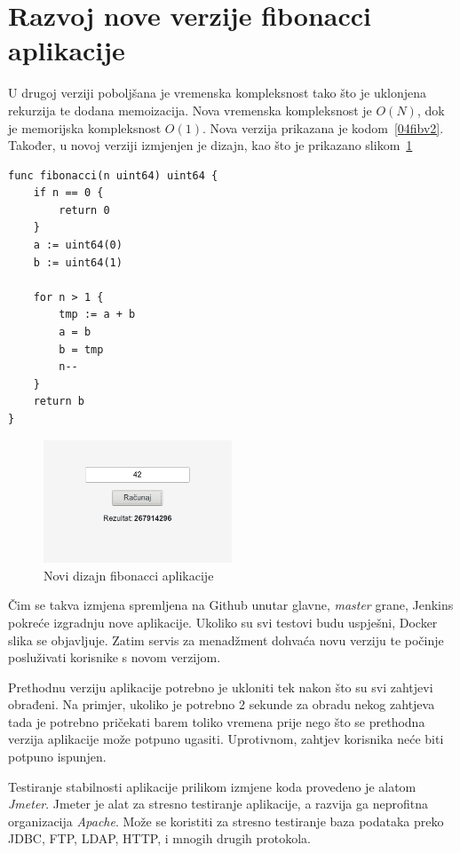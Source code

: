 \section{Razvoj nove verzije fibonacci aplikacije}
U drugoj verziji poboljšana je vremenska kompleksnost tako što je uklonjena rekurzija te dodana
memoizacija. Nova vremenska kompleksnost je $O(N)$, dok je memorijska kompleksnost $O(1)$. Nova
verzija prikazana je kodom~\ref{04fibv2}. Također, u novoj verziji izmjenjen je dizajn, kao što je
prikazano slikom~\ref{fig:04redesign}

\begin{lstlisting}[float=h]
func fibonacci(n uint64) uint64 {
	if n == 0 {
		return 0
	}
	a := uint64(0)
	b := uint64(1)

	for n > 1 {
		tmp := a + b
		a = b
		b = tmp
		n--
	}
	return b
}
\end{lstlisting}

\begin{figure}[h]
    \centering
    \includegraphics[width=0.5\textwidth]{img/04/new_app.png}
    \caption{Novi dizajn fibonacci aplikacije}%
    \label{fig:04redesign}
\end{figure}

Čim se takva izmjena spremljena na Github unutar glavne, \textit{master} grane, Jenkins pokreće
izgradnju nove aplikacije. Ukoliko su svi testovi budu uspješni, Docker slika se objavljuje. Zatim
servis za menadžment dohvaća novu verziju te počinje posluživati korisnike s novom verzijom.

Prethodnu verziju aplikacije potrebno je ukloniti tek nakon što su svi zahtjevi obrađeni. Na
primjer, ukoliko je potrebno 2 sekunde za obradu nekog zahtjeva tada je potrebno pričekati barem
toliko vremena prije nego što se prethodna verzija aplikacije može potpuno ugasiti. Uprotivnom,
zahtjev korisnika neće biti potpuno ispunjen.

Testiranje stabilnosti aplikacije prilikom izmjene koda provedeno je alatom \textit{Jmeter}. Jmeter
je alat za stresno testiranje aplikacije, a razvija ga neprofitna organizacija \textit{Apache}. Može
se koristiti za stresno testiranje baza podataka preko JDBC, FTP, LDAP, HTTP, i mnogih drugih
protokola.

